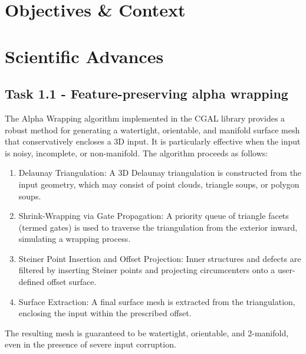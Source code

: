 
\section{Objectives \& Context}

\section{Scientific Advances}

\subsection{Task 1.1 - Feature-preserving alpha wrapping}

The Alpha Wrapping algorithm implemented in the CGAL library provides a robust method for generating a watertight, orientable, and manifold surface mesh that conservatively encloses a 3D input. It is particularly effective when the input is noisy, incomplete, or non-manifold. The algorithm proceeds as follows:

\begin{enumerate}
\item Delaunay Triangulation: A 3D Delaunay triangulation is constructed from the input geometry, which may consist of point clouds, triangle soups, or polygon soups.
\item Shrink-Wrapping via Gate Propagation: A priority queue of triangle facets (termed gates) is used to traverse the triangulation from the exterior inward, simulating a wrapping process.
\item Steiner Point Insertion and Offset Projection: Inner structures and defects are filtered by inserting Steiner points and projecting circumcenters onto a user-defined offset surface.
\item Surface Extraction: A final surface mesh is extracted from the triangulation, enclosing the input within the prescribed offset.
\end{enumerate}

The resulting mesh is guaranteed to be watertight, orientable, and 2-manifold, even in the presence of severe input corruption.

